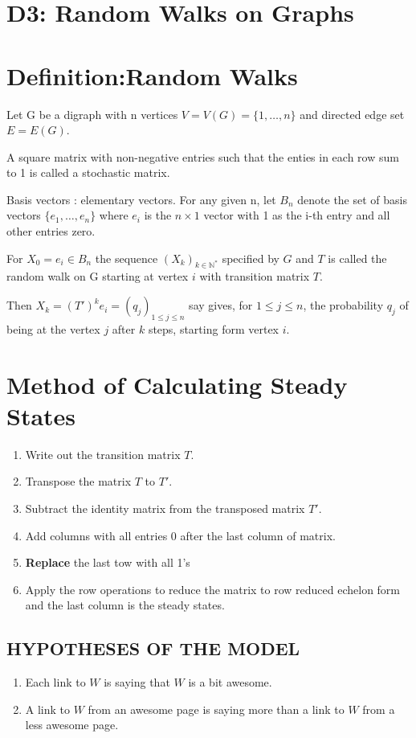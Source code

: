 \documentclass{article}
\begin{document}
\begin{spacing}{1.5}
\section{D3: Random Walks on Graphs}
\section{Definition:Random Walks}
Let G be a digraph with n vertices $V = V(G) = \{1,\dots,n\}$ and directed edge set $E = E(G)$. 

A square matrix with non-negative entries such that the enties in each row sum to 1 is called a stochastic matrix. 

Basis vectors : elementary vectors. For any given n, let $B_n$ denote the set of basis vectors $\{e_1,\dots,e_n\}$ where $e_i$ is the $n \times 1 $ vector with 1 as the i-th entry and all other entries zero. 

For $X_0=e_i \in B_n$ the sequence $(X_k)_{k \in \mathbb{N^*}} $
specified by $G$ and $T$ is called the random walk on G starting at vertex $i$ with transition matrix $T$. 

Then $X_k = (T')^k e_i = (q_j)_{1 \le j \le n}$ say gives, for $1 \le j \le n$, the probability $q_j$ of being at the vertex $j$ after $k$ steps, starting form vertex $i$. 
\section{Method of Calculating Steady States}
\begin{enumerate}
    \item Write out the transition matrix $T$. 
    \item Transpose the matrix $T$ to $T'$.
    \item Subtract the identity matrix from the transposed matrix $T'$. 
    \item Add columns with all entries 0 after the last column of matrix. 
    \item \textbf{Replace} the last tow with all 1's
    \item Apply the row operations to reduce the matrix to row reduced echelon form and the last column is the steady states. 
\end{enumerate}
\subsection{HYPOTHESES OF THE MODEL}
\begin{enumerate}
    \item Each link to $W$ is saying that $W$ is a bit awesome.
    \item A link to $W$ from an awesome page is saying more than a link to $W$ from a less awesome page.  
\end{enumerate}

\end{spacing}
\end{document}
